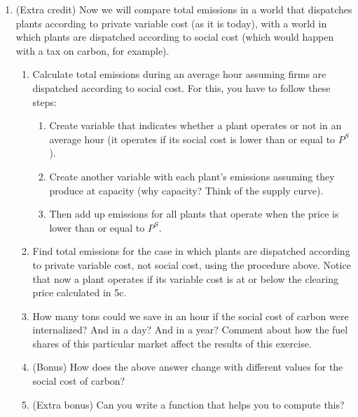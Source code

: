 \documentclass[11pt]{article}
\begin{document}
\begin{enumerate}
	\item (Extra credit) Now we will compare total emissions in a world that dispatches plants according to private variable cost (as it is today), with a world in which plants are dispatched according to social cost (which would happen with a tax on carbon, for example).
	\begin{enumerate}
	\item Calculate total emissions during an average hour assuming firms are dispatched according to social cost. For this, you have to follow these steps:
		\begin{enumerate}
		\item Create variable that indicates whether a plant operates or not in an average hour (it operates if its social cost is lower than or equal to $P^S$). 
		\item Create another variable with each plant's emissions assuming they produce at capacity (why capacity? Think of the supply curve). 
		\item Then add up emissions for all plants that operate when the price is lower than or equal to $P^S$.
		\end{enumerate}
	\item Find total emissions for the case in which plants are dispatched according to private variable cost, not social cost, using the procedure above. Notice that now a plant operates if its variable cost is at or below the clearing price calculated in 5c.
	\item How many tons could we save in an hour if the social cost of carbon were internalized? And in a day? And in a year? Comment about how the fuel shares of this particular market affect the results of this exercise.
	\item (Bonus) How does the above answer change with different values for the social cost of carbon? 
	\item (Extra bonus) Can you write a function that helps you to compute this?
		\end{enumerate}

\end{enumerate}
\end{document}
